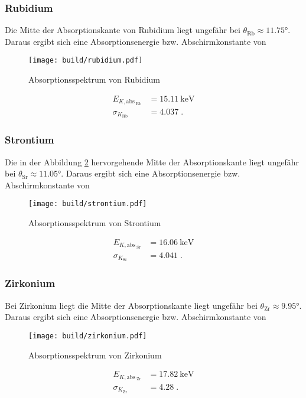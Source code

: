 \subsubsection{Rubidium}
Die Mitte der Absorptionskante von Rubidium liegt ungefähr bei $\theta_\text{Rb} \approx \ang{11.75;;}$. Daraus ergibt sich eine Absorptionsenergie bzw. Abschirmkonstante von 
\begin{figure}
    \centering
    \caption{Absorptionsspektrum von Rubidium}
    \label{fig:Rubidium}
    \texttt{[image: build/rubidium.pdf]}
\end{figure}
\begin{align*}
    E_{K, \text{abs}_\text{ Rb}}  &= \SI{15.11}{\kilo\electronvolt} \\
    \sigma_{K_\text{Rb}}         &= \num{4.037} \; \text{.}
\end{align*}
\FloatBarrier
\subsubsection{Strontium}
Die in der Abbildung \ref{fig:Strontium} hervorgehende Mitte der Absorptionskante liegt ungefähr bei $\theta_\text{Sr} \approx \ang{11.05;;}$. 
Daraus ergibt sich eine Absorptionsenergie bzw. Abschirmkonstante von 
\begin{figure}
    \centering
    \caption{Absorptionsspektrum von Strontium}
    \label{fig:Strontium}
    \texttt{[image: build/strontium.pdf]}
\end{figure}
\begin{align*}
    E_{K, \text{abs}_\text{ Sr}}  &= \SI{16.06}{\kilo\electronvolt} \\
    \sigma_{K_\text{Sr}}         &= \num{4.041} \; \text{.}
\end{align*}
\FloatBarrier
\subsubsection{Zirkonium}
Bei Zirkonium liegt die Mitte der Absorptionskante liegt ungefähr bei $\theta_\text{Zr} \approx \ang{9.95;;}$. 
Daraus ergibt sich eine Absorptionsenergie bzw. Abschirmkonstante von 
\begin{figure}
    \centering
    \caption{Absorptionsspektrum von Zirkonium}
    \label{fig:Zirkonium}
    \texttt{[image: build/zirkonium.pdf]}
\end{figure}
\begin{align*}
    E_{K, \text{abs}_\text{ Zr}}  &= \SI{17.82}{\kilo\electronvolt} \\
    \sigma_{K_\text{Zr}}         &= \num{4.28} \; \text{.}
\end{align*}
